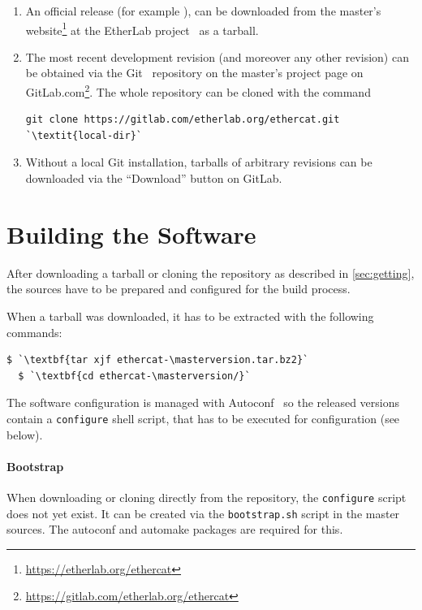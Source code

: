 \documentclass[a4paper,12pt,BCOR=6mm,bibtotoc,idxtotoc]{scrbook}
\newcommand{\masterversion}{\gittag}
\begin{document}
\begin{enumerate}

\item An official release (for example \masterversion), can be downloaded from
the master's website\footnote{\url{https://etherlab.org/ethercat}}
at the EtherLab project~\cite{etherlab} as a tarball.

\item The most recent development revision (and moreover any other revision)
can be obtained via the Git~\cite{git} repository on the master's
project page on
GitLab.com\footnote{\url{https://gitlab.com/etherlab.org/ethercat}}.
The whole repository can be cloned with the command

\begin{lstlisting}[breaklines=true]
git clone https://gitlab.com/etherlab.org/ethercat.git `\textit{local-dir}`
\end{lstlisting}

\item Without a local Git installation, tarballs of arbitrary revisions
can be downloaded via the ``Download'' button on GitLab.

\end{enumerate}

\section{Building the Software}

After downloading a tarball or cloning the repository as described in
\autoref{sec:getting}, the sources have to be prepared and configured for the
build process.

When a tarball was downloaded, it has to be extracted with the following
commands:

\begin{lstlisting}[gobble=2]
  $ `\textbf{tar xjf ethercat-\masterversion.tar.bz2}`
  $ `\textbf{cd ethercat-\masterversion/}`
\end{lstlisting}

The software configuration is managed with Autoconf~\cite{autoconf} so the
released versions contain a \lstinline+configure+ shell script, that has to be
executed for configuration (see below).

\paragraph{Bootstrap} When downloading or cloning directly from the
repository, the \lstinline+configure+ script does not yet exist. It can be
created via the \lstinline+bootstrap.sh+ script in the master sources. The
autoconf and automake packages are required for this.
\end{document}
